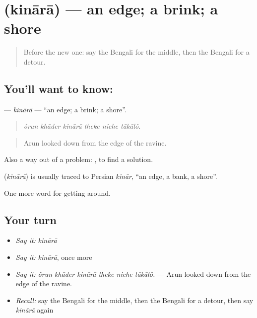 \section[\texorpdfstring{\bn{কিনারা} (kinārā)}{কিনারা (kinārā)}]{ (kinārā) — an edge; a brink; a shore}

\label{lesson:BN-C402-kinara}



\begin{quote}
Before the new one: say the Bengali for the middle, then the Bengali for a detour.
\end{quote}

\subsection*{You'll want to know: }
\textbf{} — \emph{kinārā} — \textquotedblleft{}an edge; a brink; a shore\textquotedblright{}.

\begin{quote}
     
\end{quote}

\begin{quote}
\emph{ôrun khāder kinārā theke niche tākālô.}
\end{quote}

\begin{quote}
Arun looked down from the edge of the ravine.
\end{quote}

Also a way out of a problem:  , to find a solution.

\begin{cousinweb}
\textbf{} (\emph{kinārā}) is usually traced to Persian \emph{kinār}, \textquotedblleft{}an edge, a bank, a shore\textquotedblright{}.
\end{cousinweb}

\begin{grammarlens}[title={What you've built}]
One more word for getting around.
\end{grammarlens}

\subsection*{Your turn}
\begin{itemize}
\raggedright
  \item \emph{Say it:} \emph{kinārā}
  \item \emph{Say it:} \emph{kinārā}, once more
  \item \emph{Say it:} \emph{ôrun khāder kinārā theke niche tākālô.} — Arun looked down from the edge of the ravine.
  \item \emph{Recall:} say the Bengali for the middle, then the Bengali for a detour, then say \emph{kinārā} again
\end{itemize}

